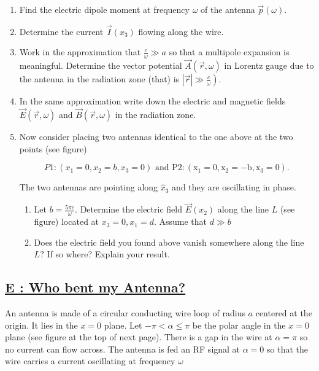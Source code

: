 \begin{enumerate}
	\item  Find the electric dipole moment at frequency $\omega$ of the antenna $\vec{p}(\omega)$.
	\item Determine the current $\vec{I}\left(x_{3}\right)$ flowing along the wire.
	\item Work in the approximation that $\frac{c}{\omega} \gg a$ so that a multipole expansion is meaningful. Determine the vector potential $\vec{A}(\vec{r}, \omega)$ in Lorentz gauge due to the antenna in the radiation zone (that) is $\left.|\vec{r}| \gg \frac{c}{\omega}\right)$.
	\item In the same approximation write down the electric and magnetic fields $\vec{E}(\vec{r}, \omega)$ and $\vec{B}(\vec{r}, \omega)$ in the radiation zone.
	\item Now consider placing two antennas identical to the one above at the two points (see figure)
	
	\begin{equation}
		P 1:\left(x_{1}=0, x_{2}=b, x_{3}=0\right) \text { and } \mathrm{P} 2:\left(\mathrm{x}_{1}=0, \mathrm{x}_{2}=-\mathrm{b}, \mathrm{x}_{3}=0\right).
	\end{equation}

	The two antennas are pointing along $\hat{x}_{3}$ and they are oscillating in phase.

	\begin{enumerate}
		\item Let $b=\frac{5 \pi c}{\omega} .$ Determine the electric field $\vec{E}\left(x_{2}\right)$ along the line $L$ (see figure) located at $x_{3}=0, x_{1}=d .$ Assume that $d \gg b$
		\item Does the electric field you found above vanish somewhere along the line $L ?$ If so where?
		Explain your result.
	\end{enumerate}
\end{enumerate}
	
	
\subsection{\hyperref[E : Who bent my Antenna?]{E : Who bent my Antenna?}}
	
An antenna is made of a circular conducting wire loop of radius $a$ centered at the origin. It lies in the $x=0$ plane. Let $-\pi<\alpha \leq \pi$ be the polar angle in the $x=0$ plane (see figure at the top of next page). There is a gap in the wire at $\alpha=\pi$ so no current can flow across. The antenna is fed an RF signal at $\alpha=0$ so that the wire carries a current oscillating at frequency $\omega$

